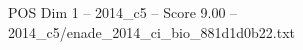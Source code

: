 \begin{textsample}{POS Dim 1 – 2014\_c5 – Score 9.00 – 2014\_c5/enade\_2014\_ci\_bio\_881d1d0b22.txt}
\end{textsample}
